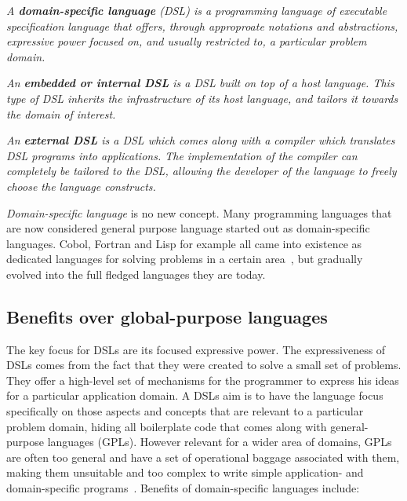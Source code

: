 \begin{definition}
    \textit{A \textbf{domain-specific language} (DSL) is a programming language of executable specification language that offers, through approproate notations and abstractions, expressive power focused on, and usually restricted to, a particular problem domain.}
\end{definition}
\begin{definition}
    \textit{An \textbf{embedded or internal DSL} is a DSL built on top of a host language. This type of DSL inherits the infrastructure of its host language, and tailors it towards the domain of interest.}
\end{definition}
\begin{definition}
    \textit{An \textbf{external DSL} is a DSL which comes along with a compiler which translates DSL programs into applications. The implementation of the compiler can completely be tailored to the DSL, allowing the developer of the language to freely choose the language constructs.}
\end{definition}
 
\textit{Domain-specific language} is no new concept. Many programming languages that are now considered general purpose language started out as domain-specific languages. Cobol, Fortran and Lisp for example all came into existence as dedicated languages for solving problems in a certain area~\cite{vanDeursen:2000}, but gradually evolved into the full fledged languages they are today. 

\subsection*{Benefits over global-purpose languages}

The key focus for DSLs are its focused expressive power. The expressiveness of DSLs comes from the fact that they were created to solve a small set of problems. They offer a high-level set of mechanisms for the programmer to express his ideas for a particular application domain. A DSLs aim is to have the language focus specifically on those aspects and concepts that are relevant to a particular problem domain, hiding all boilerplate code that comes along with general-purpose languages (GPLs). However relevant for a wider area of domains, GPLs are often too general and have a set of operational baggage associated with them, making them unsuitable and too complex to write simple application- and domain-specific programs~\cite{FluentInterfacesJava}. Benefits of domain-specific languages include:

